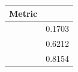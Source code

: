 \begin{tabular}{lr}
    \toprule
    Metric & \bmtwofive{} \\
    \midrule
    \mrr{} & 0.1703 \\
    \recallH{} & 0.6212 \\
    \recallK{} & 0.8154 \\
    \bottomrule
\end{tabular}
